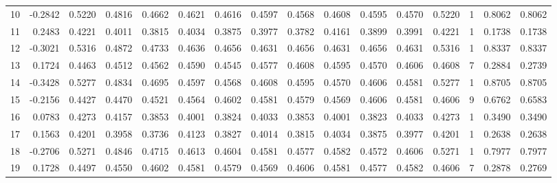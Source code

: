 \begin{tabular}{lrrrrrrrrrrrrrrr}
10 &     -0.2842 &  0.5220 &  0.4816 &  0.4662 &  0.4621 &  0.4616 &  0.4597 &  0.4568 &  0.4608 &  0.4595 &   0.4570 &     0.5220 &      1 &                    0.8062 &                     0.8062 \\
11 &      0.2483 &  0.4221 &  0.4011 &  0.3815 &  0.4034 &  0.3875 &  0.3977 &  0.3782 &  0.4161 &  0.3899 &   0.3991 &     0.4221 &      1 &                    0.1738 &                     0.1738 \\
12 &     -0.3021 &  0.5316 &  0.4872 &  0.4733 &  0.4636 &  0.4656 &  0.4631 &  0.4656 &  0.4631 &  0.4656 &   0.4631 &     0.5316 &      1 &                    0.8337 &                     0.8337 \\
13 &      0.1724 &  0.4463 &  0.4512 &  0.4562 &  0.4590 &  0.4545 &  0.4577 &  0.4608 &  0.4595 &  0.4570 &   0.4606 &     0.4608 &      7 &                    0.2884 &                     0.2739 \\
14 &     -0.3428 &  0.5277 &  0.4834 &  0.4695 &  0.4597 &  0.4568 &  0.4608 &  0.4595 &  0.4570 &  0.4606 &   0.4581 &     0.5277 &      1 &                    0.8705 &                     0.8705 \\
15 &     -0.2156 &  0.4427 &  0.4470 &  0.4521 &  0.4564 &  0.4602 &  0.4581 &  0.4579 &  0.4569 &  0.4606 &   0.4581 &     0.4606 &      9 &                    0.6762 &                     0.6583 \\
16 &      0.0783 &  0.4273 &  0.4157 &  0.3853 &  0.4001 &  0.3824 &  0.4033 &  0.3853 &  0.4001 &  0.3823 &   0.4033 &     0.4273 &      1 &                    0.3490 &                     0.3490 \\
17 &      0.1563 &  0.4201 &  0.3958 &  0.3736 &  0.4123 &  0.3827 &  0.4014 &  0.3815 &  0.4034 &  0.3875 &   0.3977 &     0.4201 &      1 &                    0.2638 &                     0.2638 \\
18 &     -0.2706 &  0.5271 &  0.4846 &  0.4715 &  0.4613 &  0.4604 &  0.4581 &  0.4577 &  0.4582 &  0.4572 &   0.4606 &     0.5271 &      1 &                    0.7977 &                     0.7977 \\
19 &      0.1728 &  0.4497 &  0.4550 &  0.4602 &  0.4581 &  0.4579 &  0.4569 &  0.4606 &  0.4581 &  0.4577 &   0.4582 &     0.4606 &      7 &                    0.2878 &                     0.2769 \\
\bottomrule
\end{tabular}

